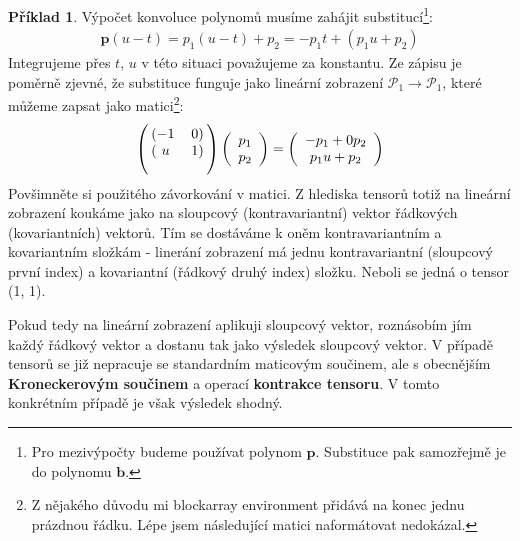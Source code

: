 \documentclass[a5paper,12pt]{amsbook}
\theoremstyle{definition}
\newtheorem{example}{Příklad}[chapter]
\newcommand{\myvec}[1]{\bm{#1}}
\begin{document}
\begin{example}
\medskip\noindent
Výpočet konvoluce polynomů musíme zahájit substitucí\footnote{
  Pro mezivýpočty budeme používat polynom $\myvec{p}$. Substituce pak samozřejmě
  je do polynomu $\myvec{b}$.
}:
\begin{equation*}
\begin{split}
\myvec{p}(u - t) = p_1(u - t) + p_2 = -p_1t + (p_1 u + p_2)
\end{split}
\end{equation*}
Integrujeme přes $t$, $u$ v této situaci považujeme za konstantu. Ze zápisu
je poměrně zjevné, že substituce funguje jako lineární zobrazení
$\mathcal{P}_1\rightarrow\mathcal{P}_1$, které můžeme zapsat jako matici\footnote{
  Z nějakého důvodu mi blockarray environment přidává na konec jednu prázdnou řádku.
  Lépe jsem následující matici naformátovat nedokázal.
}:
\begin{equation*}
\left(\begin{blockarray}{cc}
\begin{block}{(cc)}
-1 & 0 \\
\end{block}
\begin{block}{(cc)}
 u & 1 \\
\end{block}
\end{blockarray}\right)\left(
\begin{array}{c}
p_1 \\ p_2
\end{array}\right) = \left(
\begin{array}{c}
-p_1 + 0 p_2 \\ p_1 u + p_2
\end{array}
\right)
\end{equation*}
Povšimněte si použitého závorkování v matici. Z hlediska tensorů totiž na lineární
zobrazení koukáme jako na sloupcový (kontravariantní) vektor řádkových (kovariantních)
vektorů. Tím se dostáváme k oněm kontravariantním a kovariantním složkám - linerání
zobrazení má jednu kontravariantní (sloupcový první index) a kovariantní (řádkový
druhý index) složku. Neboli se jedná o tensor (1, 1).

Pokud tedy na lineární zobrazení aplikuji sloupcový vektor, roznásobím jím každý řádkový
vektor a dostanu tak jako výsledek sloupcový vektor. V případě tensorů se již nepracuje
se standardním maticovým součinem, ale s obecnějším \textbf{Kroneckerovým součinem}
a operací \textbf{kontrakce tensoru}. V tomto konkrétním případě je však výsledek
shodný.


\end{example}
\end{document}
